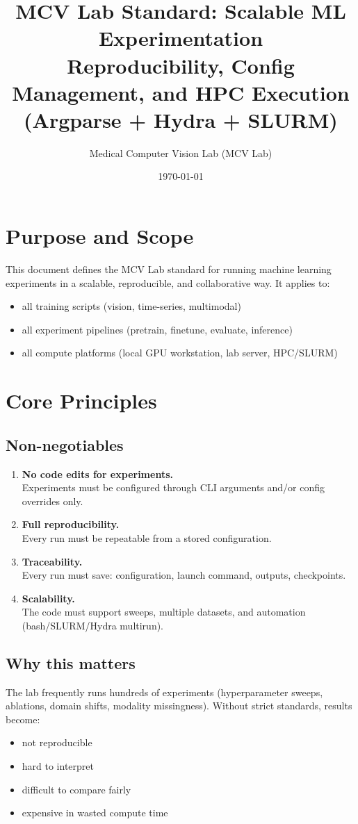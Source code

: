\documentclass[11pt]{article}
\title{\textbf{MCV Lab Standard: Scalable ML Experimentation}\\
\large Reproducibility, Config Management, and HPC Execution (Argparse + Hydra + SLURM)}
\author{Medical Computer Vision Lab (MCV Lab)}
\date{\today}
\begin{document}
\maketitle

\section{Purpose and Scope}
This document defines the MCV Lab standard for running machine learning experiments in a scalable, reproducible, and collaborative way.
It applies to:
\begin{itemize}[nosep]
    \item all training scripts (vision, time-series, multimodal)
    \item all experiment pipelines (pretrain, finetune, evaluate, inference)
    \item all compute platforms (local GPU workstation, lab server, HPC/SLURM)
\end{itemize}

\section{Core Principles}
\subsection{Non-negotiables}
\begin{enumerate}[label=\textbf{P\arabic*.}, leftmargin=*]
    \item \textbf{No code edits for experiments.}\\
    Experiments must be configured through CLI arguments and/or config overrides only.
    \item \textbf{Full reproducibility.}\\
    Every run must be repeatable from a stored configuration.
    \item \textbf{Traceability.}\\
    Every run must save: configuration, launch command, outputs, checkpoints.
    \item \textbf{Scalability.}\\
    The code must support sweeps, multiple datasets, and automation (bash/SLURM/Hydra multirun).
\end{enumerate}

\subsection{Why this matters}
The lab frequently runs hundreds of experiments (hyperparameter sweeps, ablations, domain shifts, modality missingness).
Without strict standards, results become:
\begin{itemize}[nosep]
    \item not reproducible
    \item hard to interpret
    \item difficult to compare fairly
    \item expensive in wasted compute time
\end{itemize}
\end{document}
